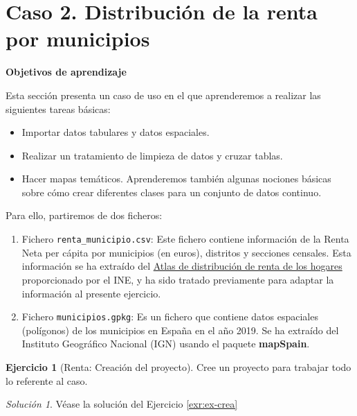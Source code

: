 \documentclass[
]{book}
\theoremstyle{definition}
\theoremstyle{definition}
\theoremstyle{definition}
\newtheorem{exercise}{Ejercicio}[chapter]
\theoremstyle{definition}
\theoremstyle{remark}
\newtheorem*{solution}{Solución}
\begin{document}
\hypertarget{caso-2.-distribuciuxf3n-de-la-renta-por-municipios}{%
\section{Caso 2. Distribución de la renta por municipios}\label{caso-2.-distribuciuxf3n-de-la-renta-por-municipios}}

\textbf{Objetivos de aprendizaje}

Esta sección presenta un caso de uso en el que aprenderemos a realizar las
siguientes tareas básicas:

\begin{itemize}
\item
  Importar datos tabulares y datos espaciales.
\item
  Realizar un tratamiento de limpieza de datos y cruzar tablas.
\item
  Hacer mapas temáticos. Aprenderemos también algunas nociones básicas sobre
  cómo crear diferentes clases para un conjunto de datos continuo.
\end{itemize}

Para ello, partiremos de dos ficheros:

\begin{enumerate}
\def\labelenumi{\arabic{enumi}.}
\item
  Fichero \texttt{renta\_municipio.csv}: Este fichero contiene información de la Renta
  Neta per cápita por municipios (en euros), distritos y secciones censales.
  Esta información se ha extraído del \href{https://www.ine.es/experimental/atlas/experimental_atlas.htm}{Atlas de distribución de renta de los
  hogares}
  proporcionado por el INE, y ha sido tratado previamente para adaptar la
  información al presente ejercicio.
\item
  Fichero \texttt{municipios.gpkg}: Es un fichero que contiene datos espaciales
  (polígonos) de los municipios en España en el año 2019. Se ha extraído del
  Instituto Geográfico Nacional (IGN) usando el paquete \textbf{mapSpain}.
\end{enumerate}

\begin{exercise}[Renta: Creación del proyecto]
\protect\hypertarget{exr:ex-crearenta}{}\label{exr:ex-crearenta}Cree un proyecto para trabajar todo lo referente al caso.
\end{exercise}

\begin{solution}
Véase la solución del Ejercicio \ref{exr:ex-crea}
\end{solution}
\end{document}
